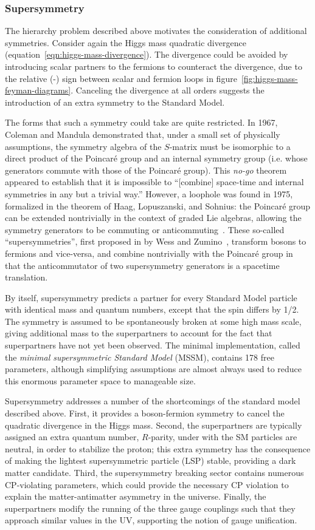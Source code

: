 \subsubsection{Supersymmetry}
The hierarchy problem described above motivates the consideration of additional symmetries. Consider again the Higgs mass quadratic divergence (equation~\ref{eqn:higgs-mass-divergence}). The divergence could be avoided by introducing scalar partners to the fermions to counteract the divergence, due to the relative (-) sign between scalar and fermion loops in figure~\ref{fig:higgs-mass-feyman-diagrams}. Canceling the divergence at all orders suggests the introduction of an extra symmetry to the Standard Model. 

The forms that such a symmetry could take are quite restricted. In 1967, Coleman and Mandula demonstrated that, under a small set of physically assumptions, the symmetry algebra of the $S$-matrix must be isomorphic to a direct product of the Poincar\'{e} group and an internal symmetry group (i.e. whose generators commute with those of the Poincar\'{e} group). This \emph{no-go} theorem appeared to establish that it is impossible to ``[combine] space-time and internal symmetries in any but a trivial way.'' However, a loophole was found in 1975, formalized in the theorem of Haag, Lopuszanski, and Sohnius: the Poincar\'{e} group can be extended nontrivially in the context of graded Lie algebras, allowing the symmetry generators to be commuting or anticommuting~\cite{Haag1975257}. These so-called ``supersymmetries'', first proposed in by Wess and Zumino~\cite{Wess197439}, transform bosons to fermions and vice-versa, and combine nontrivially with the Poincar\'{e} group in that the anticommutator of two supersymmetry generators is a spacetime translation. 

By itself, supersymmetry predicts a partner for every Standard Model particle with identical mass and quantum numbers, except that the spin differs by 1/2. The symmetry is assumed to be spontaneously broken at some high mass scale, giving additional mass to the superpartners to account for the fact that superpartners have not yet been observed. The minimal implementation, called the \emph{minimal supersymmetric Standard Model} (MSSM), contains 178 free parameters, although simplifying assumptions are almost always used to reduce this enormous parameter space to manageable size.

Supersymmetry addresses a number of the shortcomings of the standard model described above. First, it provides a boson-fermion symmetry to cancel the quadratic divergence in the Higgs mass. Second, the superpartners are typically assigned an extra quantum number, $R$-parity, under with the SM particles are neutral, in order to stabilize the proton; this extra symmetry has the consequence of making the lightest supersymmetric particle (LSP) stable, providing a dark matter candidate. Third, the supersymmetry breaking sector contains numerous CP-violating parameters, which could provide the necessary CP violation to explain the matter-antimatter asymmetry in the universe. Finally, the superpartners modify the running of the three gauge couplings such that they approach similar values in the UV, supporting the notion of gauge unification. 

